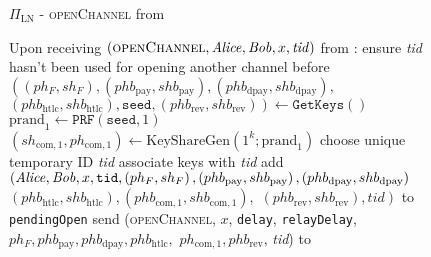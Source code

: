 \begin{figure}[!htbp]
  \begin{protocolbox}{$\Pi_{\mathrm{LN}}$ - \textsc{openChannel} from
  \environment}
    \begin{algorithmic}[1]
      \State Upon receiving $\left(\textsc{openChannel}, \mathit{Alice}, \mathit{Bob}, x,
      \mathit{tid}\right)$ from \environment:
      \Indent
        \State ensure \textit{tid} hasn't been used for opening another channel
        before
        \State $\left(\left(ph_F, sh_F\right), \left(phb_{\mathrm{pay}},
        shb_{\mathrm{pay}}\right), \left(phb_{\mathrm{dpay}},
        shb_{\mathrm{dpay}}\right),\right.$ $\left.\left(phb_{\mathrm{htlc}},
        shb_{\mathrm{htlc}}\right), \mathtt{seed}, \left(phb_{\mathrm{rev}},
        shb_{\mathrm{rev}}\right)\right) \gets \texttt{GetKeys}\left(\right)$
        \State $\mathrm{prand}_1 \gets \texttt{PRF}\left(\mathtt{seed},
        1\right)$
        \State $\left(sh_{\mathrm{com}, 1}, ph_{\mathrm{com}, 1}\right) \gets
        \mathrm{KeyShareGen}\left(1^k; \mathrm{prand}_1\right)$
        \State choose unique temporary ID \textit{tid} 
        \State associate keys with \textit{tid}
        \State add $\left(\mathit{Alice}, \mathit{Bob}, x, \mathtt{tid}, \left(ph_F,
        sh_F\right), \left(phb_{\mathrm{pay}}, shb_{\mathrm{pay}}\right),
        \left(phb_{\mathrm{dpay}}, shb_{\mathrm{dpay}}\right)\right.$
        $\left.\left(phb_{\mathrm{htlc}}, shb_{\mathrm{htlc}}\right),
        \left(phb_{\mathrm{com}, 1}, shb_{\mathrm{com}, 1}\right),\right.$
        $\left.\left(phb_{\mathrm{rev}}, shb_{\mathrm{rev}}\right),
        \mathit{tid}\right)$ to \texttt{pendingOpen}
        \State send (\textsc{openChannel}, $x$, \texttt{delay},
        \texttt{relayDelay}, $ph_F, phb_{\mathrm{pay}}, phb_{\mathrm{dpay}},
        phb_{\mathrm{htlc}},$ $ph_{\mathrm{com}, 1}, phb_{\mathrm{rev}}$,
        \textit{tid}) to \bob{}
      \EndIndent
    \end{algorithmic}
  \end{protocolbox}
  \caption{}
  \label{alg:protocol:open:env}
\end{figure}

